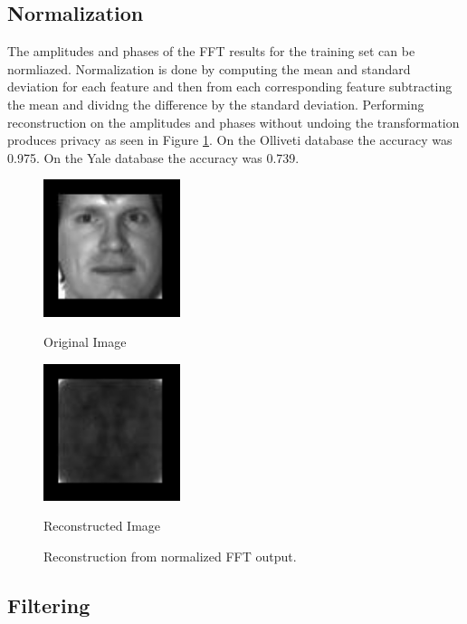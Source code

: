 \documentclass{article}
\begin{document}
\subsection{Normalization}

The amplitudes and phases of the FFT results for the training set can 
be normliazed. Normalization is done by computing the mean and standard 
deviation for each feature and then from each corresponding feature subtracting the mean 
and dividng the difference by the standard deviation. Performing reconstruction 
on the amplitudes and phases without undoing the transformation produces privacy as seen 
in Figure \ref{fig:norm}. On the Olliveti database the accuracy was 0.975. On the Yale database the accuracy was 0.739.

\begin{figure}[!htb]

\begin{minipage}[b]{.48\linewidth}
  \centering
  \centerline{\includegraphics[width=4.0cm]{recon/denorm_Yale}}
  \centerline{Original Image}\medskip
\end{minipage}
\hfill
\begin{minipage}[b]{0.48\linewidth}
  \centering
  \centerline{\includegraphics[width=4.0cm]{recon/norm_Yale}}
  \centerline{Reconstructed Image}\medskip
\end{minipage}
%
\caption{Reconstruction from normalized FFT output.}
\label{fig:norm}
%
\end{figure}

\subsection{Filtering}
\end{document}
